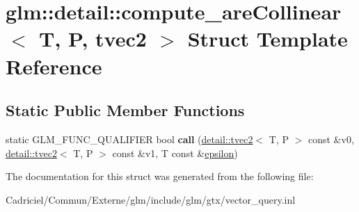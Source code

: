 \hypertarget{structglm_1_1detail_1_1compute__are_collinear_3_01_t_00_01_p_00_01tvec2_01_4}{}\section{glm\+:\+:detail\+:\+:compute\+\_\+are\+Collinear$<$ T, P, tvec2 $>$ Struct Template Reference}
\label{structglm_1_1detail_1_1compute__are_collinear_3_01_t_00_01_p_00_01tvec2_01_4}
\subsection*{Static Public Member Functions}
\begin{DoxyCompactItemize}
\item 
static G\+L\+M\+\_\+\+F\+U\+N\+C\+\_\+\+Q\+U\+A\+L\+I\+F\+I\+ER bool {\bfseries call} (\hyperlink{structglm_1_1detail_1_1tvec2}{detail\+::tvec2}$<$ T, P $>$ const \&v0, \hyperlink{structglm_1_1detail_1_1tvec2}{detail\+::tvec2}$<$ T, P $>$ const \&v1, T const \&\hyperlink{group__gtc__constants_gacb41049b8d22c8aa90e362b96c524feb}{epsilon})\hypertarget{structglm_1_1detail_1_1compute__are_collinear_3_01_t_00_01_p_00_01tvec2_01_4_a2f040e5d783927c363a8c14c5cec65d8}{}\label{structglm_1_1detail_1_1compute__are_collinear_3_01_t_00_01_p_00_01tvec2_01_4_a2f040e5d783927c363a8c14c5cec65d8}

\end{DoxyCompactItemize}


The documentation for this struct was generated from the following file\+:\begin{DoxyCompactItemize}
\item 
Cadriciel/\+Commun/\+Externe/glm/include/glm/gtx/vector\+\_\+query.\+inl\end{DoxyCompactItemize}
